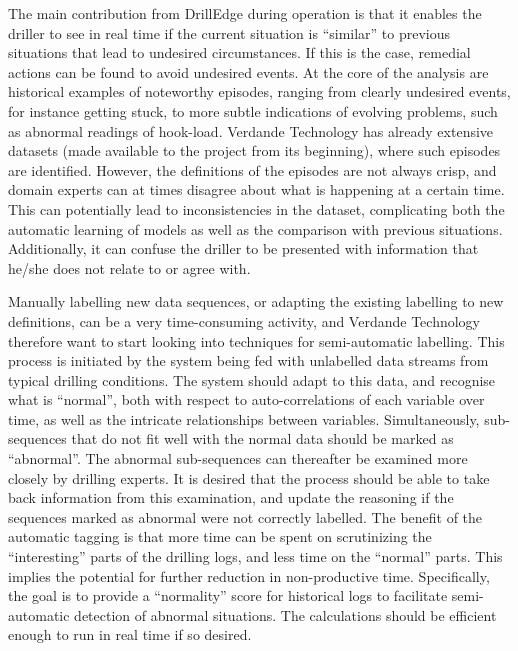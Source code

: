 The main contribution from DrillEdge during operation is that it enables the driller to see in real time if the current situation is ``similar'' to previous situations that lead to undesired circumstances. 
If this is the case, remedial actions can be found to avoid undesired events. 
At the core of the analysis are historical examples of noteworthy episodes, ranging from clearly undesired events, for instance getting stuck, to more subtle indications of evolving problems, such as abnormal readings of hook-load. 
Verdande Technology has already extensive datasets (made available to the project from its beginning), where such episodes are identified. 
However, the definitions of the episodes are not always crisp, and domain experts can at times disagree about what is happening at a certain time. 
This can potentially lead to inconsistencies in the dataset, complicating both the automatic learning of models as well as the comparison with previous situations. 
Additionally, it can confuse the driller to be presented with information that he/she does not relate to or agree with.

Manually labelling new data sequences, or adapting the existing labelling to new definitions, can be a very time-consuming activity, and Verdande Technology therefore want to start looking into techniques for semi-automatic labelling.
This process is initiated by the system being fed with unlabelled data streams from typical drilling conditions. The system should adapt to this data, and recognise what is ``normal'', both with respect to auto-correlations of each variable over time, as well as the intricate relationships between variables. Simultaneously, sub-sequences that do not fit well with the normal data should be marked as ``abnormal''.
The abnormal sub-sequences can thereafter be examined more closely by drilling experts. It is desired that the process should be able to take back information from this examination, and update the reasoning if the sequences marked as abnormal were not correctly labelled. The benefit of the automatic tagging is that more time can be spent on scrutinizing the ``interesting'' parts of the drilling logs, and less time on the ``normal'' parts. 
This implies the potential for further reduction in non-productive time. Specifically, the goal is to provide a ``normality'' score for historical logs to facilitate semi-automatic detection of abnormal situations. The calculations should be efficient enough to run in real time if so desired.

